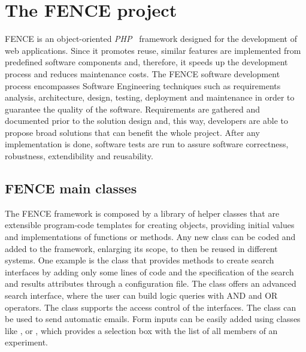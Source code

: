 
\section{The FENCE project}%
\label{sec:The_FENCE_project}

FENCE is an object-oriented \textit{PHP}~\cite{php} framework designed for the development of web applications.
Since it promotes reuse, similar features are implemented from predefined software components and, therefore, it speeds up the development process and reduces maintenance costs.
The FENCE software development process encompasses Software Engineering techniques such as requirements analysis, architecture, design, testing, deployment and maintenance in order to guarantee the quality of the software. Requirements are gathered and documented prior to the solution design and, this way, developers are able to propose broad solutions that can benefit the whole project. After any implementation is done, software tests are run to assure software correctness, robustness, extendibility and reusability.

\subsection{FENCE main classes}%
\label{sec:FENCE_main_classes}

The FENCE framework is composed by a library of helper classes that are extensible program-code templates for creating objects, providing initial values and implementations of functions or methods.
Any new class can be coded and added to the framework, enlarging its scope, to then be reused in different systems.
One example is the  class that provides methods to create search interfaces by adding only some lines of code and the specification of the search and results attributes through a configuration file.
The  class offers an advanced search interface, where the user can build logic queries with AND and OR operators.
The  class supports the access control of the interfaces.
The  class can be used to send automatic emails.
Form inputs can be easily added using classes like ,  or , which provides a selection box with the list of all members of an experiment.

